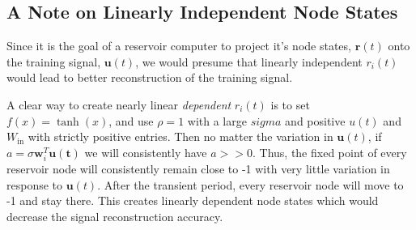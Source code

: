 \documentclass[journal]{journal}
\begin{document}
\subsection{A Note on Linearly Independent Node States}
Since it is the goal of a reservoir computer to project it's node states, $\mathbf{r}(t)$ onto the training signal, $\mathbf{u}(t)$, we would presume that linearly independent $r_i(t)$ would lead to better reconstruction of the training signal.

A clear way to create nearly linear \textit{dependent} $r_i(t)$ is to set $f(x) = \tanh(x)$, and use $\rho = 1$ with a large $sigma$ and positive $u(t)$ and $W_\text{in}$ with strictly positive entries. Then no matter the variation in $\mathbf{u}(t)$, if $a = \sigma \mathbf{w}_i^T \mathbf{u(t)}$ we will consistently  have $a >> 0$. Thus, the fixed point of every reservoir node will consistently remain close to -1 with very little variation in response to $\mathbf{u}(t)$. After the transient period, every reservoir node will move to -1 and stay there. This creates linearly dependent node states which would decrease the signal reconstruction accuracy. 
\end{document}
